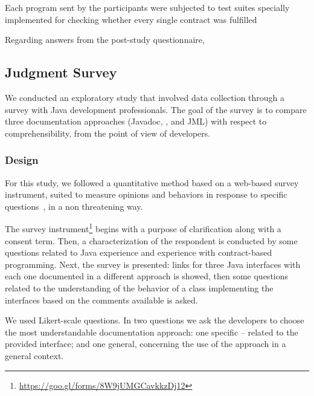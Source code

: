 Each program sent by the participants were subjected to test suites specially implemented for checking whether every single contract was fulfilled 

Regarding answers from the post-study questionnaire, 



\subsection{Judgment Survey}
\label{sec:survey}

We conducted an exploratory study that involved data collection through a survey with Java
development professionals. 
The goal of the survey is to compare three documentation approaches (Javadoc,
\contractjdoc{}, and JML) with respect to comprehensibility, from the point of view of developers. 

\subsubsection{Design}
\label{sec:surveyDes}

For this study, we followed a quantitative method based on a web-based survey instrument, suited to
measure opinions and behaviors in response to specific questions~\cite{refSurvey}, in a non
threatening way. 

The survey
instrument\footnote{\url{https://goo.gl/forms/8W9jUMGCavkkzDj12}} begins with a
purpose of clarification along with a consent term.
Then, a characterization of the
respondent is conducted by some questions related to Java experience and experience with
contract-based programming. Next, the survey is presented: links for three Java interfaces with each
one documented in a different approach is showed, then some questions related to the understanding
of the behavior of a class implementing the interfaces based on the comments available is asked. 

We used Likert-scale questions. In two questions we ask the developers to
choose the most understandable documentation approach: one specific -- related
to the provided interface; and one general, concerning the use of the approach in a general
context.


